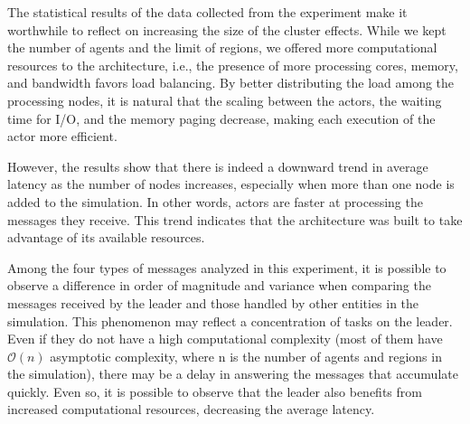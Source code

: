 \documentclass[preprint,12pt]{elsarticle}
\begin{document}
\begin{comment}
\begin{table}[ht!]
    \centering
    \caption{Paired comparison (Tukey-HSD test) for average latencies of \textbf{SolutionResponse} messages}
    \begin{tabular}{cccc}
    \toprule
    \multicolumn{2}{c}{\textbf{Instances}} & \textbf{p-value} & \textbf{Rejects $H_0$?}\\
    \midrule
    S3  &  S4 & 0.001   & Yes  \\
    S3  &  S5 & 0.001   & Yes  \\
    S3  &  S6 & 0.001   & Yes  \\
    S4  &  S5 &  0.0862 & No \\
    S4  &  S6 &   0.004 & Yes  \\
    S5  &  S6 &  0.6325 & No \\
     \bottomrule
    \end{tabular}
    \label{tab:solution_response}
\end{table}
\end{comment}

The statistical results of the data collected from the experiment make it worthwhile to reflect on increasing the size of the cluster effects. While we kept the number of agents and the limit of regions, we offered more computational resources to the architecture, i.e., the presence of more processing cores, memory, and bandwidth favors load balancing. By better distributing the load among the processing nodes, it is natural that the scaling between the actors, the waiting time for I/O, and the memory paging decrease, making each execution of the actor more efficient.

However, the results show that there is indeed a downward trend in average latency as the number of nodes increases, especially when more than one node is added to the simulation. In other words, actors are faster at processing the messages they receive. This trend indicates that the architecture was built to take advantage of its available resources.

Among the four types of messages analyzed in this experiment, it is possible to observe a difference in order of magnitude and variance when comparing the messages received by the leader and those handled by other entities in the simulation. This phenomenon may reflect a concentration of tasks on the leader. Even if they do not have a high computational complexity (most of them have $\mathcal{O}(n)$ asymptotic complexity, where n is the number of agents and regions in the simulation), there may be a delay in answering the messages that accumulate quickly. Even so, it is possible to observe that the leader also benefits from increased computational resources, decreasing the average latency.
\end{document}
